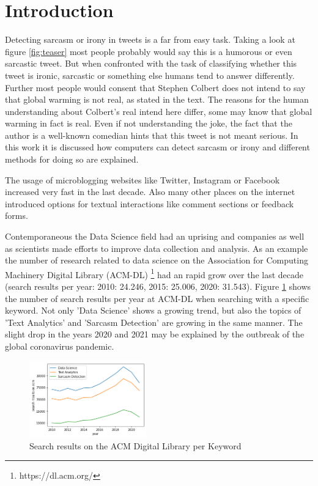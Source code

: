 \documentclass[sigconf,  review=false, nonacm=true]{acmart}
\begin{document}




\section{Introduction}
Detecting sarcasm or irony in tweets is a far from easy task. Taking a look at figure \ref{fig:teaser} most people probably would say this is a humorous or even sarcastic tweet. But when confronted with the task of classifying whether this tweet is ironic, sarcastic or something else humans tend to answer differently. Further most people would consent that Stephen Colbert does not intend to say that global warming is not real, as stated in the text. The reasons for the human understanding about Colbert's real intend here differ, some may know that global warming in fact is real. Even if not understanding the joke, the fact that the author is a well-known comedian hints that this tweet is not meant serious. In this work it is discussed how computers can detect sarcasm or irony and different methods for doing so are explained.

The usage of microblogging websites like Twitter, Instagram or Facebook increased very fast in the last decade. Also many other places on the internet introduced options for textual interactions like comment sections or feedback forms.

Contemporaneous the Data Science field had an uprising and companies as well as scientists made efforts to improve data collection and analysis. As an example the number of research related to data science on the Association for Computing Machinery Digital Library (ACM-DL) \footnote{https://dl.acm.org/} had an rapid grow over the last decade (search results per year: 2010: 24.246, 2015: 25.006, 2020: 31.543). Figure \ref{fig:search_results} shows the number of search results per year at ACM-DL when searching with a specific keyword. Not only 'Data Science' shows a growing trend, but also the topics of 'Text Analytics' and 'Sarcasm Detection' are growing in the same manner. The slight drop in the years 2020 and 2021 may be explained by the outbreak of the global coronavirus pandemic.
\begin{figure}[h]
    \centering
    \includegraphics[width=0.45\textwidth]{./sources/search_results}
    \caption{Search results on the ACM Digital Library per Keyword}
    \label{fig:search_results}
\end{figure}
\end{document}
